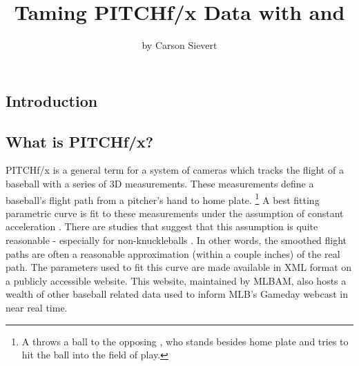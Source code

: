\begin{article}





\title{Taming PITCHf/x Data with  and }


\author{by Carson Sievert}

\maketitle
{}


\section{Introduction}


\subsection{What is PITCHf/x?}

PITCHf/x is a general term for a system of cameras which tracks the
flight of a baseball with a series of 3D measurements. These measurements
define a baseball's flight path from a pitcher's hand to home plate.%
\footnote{A  throws a ball to the opposing , who
stands besides home plate and tries to hit the ball into the field
of play.%
} A best fitting parametric curve is fit to these measurements under
the assumption of constant acceleration \citet{patent}. There are
studies that suggest that this assumption is quite reasonable - especially
for non-knuckleballs \citet{trajecoryAnalysis}. In other words, the
smoothed flight paths are often a reasonable approximation (within
a couple inches) of the real path. The parameters used to fit this
curve are made available in XML format on a publicly accessible website.
This website, maintained by MLBAM, also hosts a wealth of other baseball
related data used to inform MLB's Gameday webcast in near real time.



\end{article}
